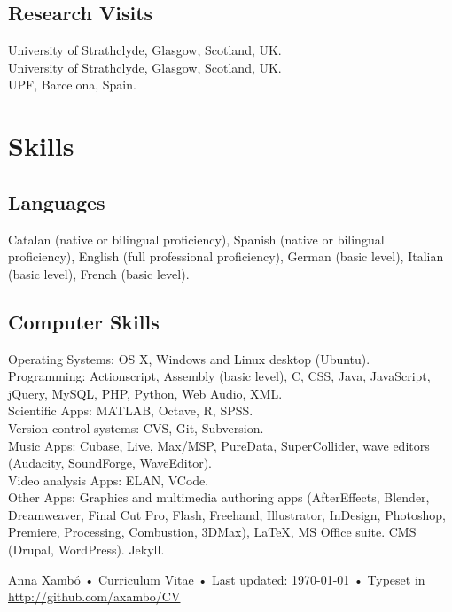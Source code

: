 \documentclass[10pt, a4paper]{article}
\newcommand{\years}[1]{\marginnote{\scriptsize #1}}
\begin{document}
\subsection*{Research Visits}

\years{05/2012}University of Strathclyde, Glasgow, Scotland, UK.\\
\years{06/2011}University of Strathclyde, Glasgow, Scotland, UK.\\
\years{04/2011--05/2011} UPF, Barcelona, Spain.

\section*{Skills}
\noindent

\subsection*{Languages}
\noindent

Catalan (native or bilingual proficiency), Spanish (native or bilingual proficiency), English (full professional proficiency), German (basic level), Italian (basic level), French (basic level).

\subsection*{Computer Skills}
\noindent

Operating Systems: OS X, Windows and Linux desktop (Ubuntu).\\
Programming: Actionscript, Assembly (basic level), C, CSS, Java, JavaScript, jQuery, MySQL, PHP, Python, Web Audio, XML.\\
Scientific Apps: MATLAB, Octave, R, SPSS.\\
Version control systems: CVS, Git, Subversion.\\
Music Apps: Cubase, Live, Max/MSP, PureData, SuperCollider, wave editors (Audacity, SoundForge, WaveEditor).\\
Video analysis Apps: ELAN, VCode.\\
Other Apps: Graphics and multimedia authoring apps (AfterEffects, Blender, Dreamweaver, Final Cut Pro, Flash, Freehand, Illustrator, InDesign, Photoshop, Premiere, Processing, Combustion, 3DMax), LaTeX, MS Office suite. CMS (Drupal, WordPress). Jekyll.


\vfill{}

\begin{center}
{\scriptsize  Anna Xambó •\- Curriculum Vitae •\- Last updated: \today\- •\- %
Typeset in \href{http://nitens.org/taraborelli/cvtex}{
\XeTeX }\\
\href{http://github.com/axambo/CV}{http://github.com/axambo/CV}}
\end{center}
\end{document}
